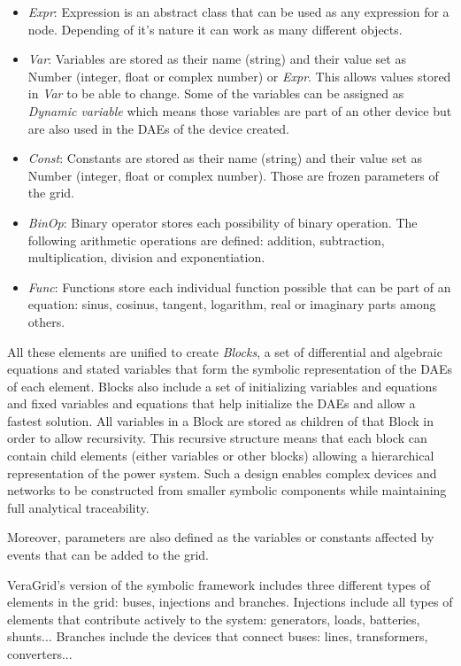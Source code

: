 \begin{itemize}
  \item \textit{Expr}: Expression is an abstract class that can be used as any expression for a node. Depending of it's nature it can work as many different objects.
  \item \textit{Var}: Variables are stored as their name (string) and their value set as Number (integer, float or complex number) or \textit{Expr}. This allows values stored in
  \textit{Var} to be able to change. Some of the variables can be assigned as \textit{Dynamic variable} which means those variables are part of an other device but are also used in
  the DAEs of the device created.
  \item \textit{Const}: Constants are stored as their name (string) and their value set as Number (integer, float or complex number). Those are frozen parameters of the grid.
  \item \textit{BinOp}: Binary operator stores each possibility of binary operation. The following arithmetic operations are defined: addition, subtraction, multiplication, division and exponentiation.
  \item \textit{Func}: Functions store each individual function possible that can be part of an equation: sinus, cosinus, tangent, logarithm, real or imaginary parts among others.
\end{itemize}

All these elements are unified to create \textit{Blocks}, a set of differential and algebraic equations and stated variables that form the symbolic representation of the DAEs of each
element. Blocks also include a set of initializing variables and equations and fixed variables and equations that help initialize the DAEs and allow a fastest solution. All variables in a Block are stored as 
children of that Block in order to allow recursivity. This recursive structure means that each block can contain child elements (either variables or 
other blocks) allowing a hierarchical representation of the power system. Such a design enables complex devices and networks to be constructed from smaller symbolic components 
while maintaining full analytical traceability.


Moreover, parameters are also defined as the variables or constants affected by events that can be added to the grid.

VeraGrid's version of the symbolic framework includes three different types of elements in the grid: buses, injections and branches. Injections include all types of elements
that contribute actively to the system: generators, loads, batteries, shunts... Branches include the devices that connect buses: lines, transformers, converters... 

